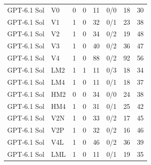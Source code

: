 \begin{tabular}{llrrrrrr}
GPT-6.1 Sol & V0 & 0 & 0 & 11 & 0/0 & 18 & 30 \\
GPT-6.1 Sol & V1 & 1 & 0 & 32 & 0/1 & 23 & 38 \\
GPT-6.1 Sol & V2 & 1 & 0 & 34 & 0/2 & 19 & 48 \\
GPT-6.1 Sol & V3 & 1 & 0 & 40 & 0/2 & 36 & 47 \\
GPT-6.1 Sol & V4 & 1 & 0 & 88 & 0/2 & 92 & 56 \\
GPT-6.1 Sol & LM2 & 1 & 1 & 11 & 0/3 & 18 & 34 \\
GPT-6.1 Sol & LM4 & 1 & 0 & 11 & 0/1 & 18 & 37 \\
GPT-6.1 Sol & HM2 & 0 & 0 & 34 & 0/0 & 24 & 38 \\
GPT-6.1 Sol & HM4 & 1 & 0 & 31 & 0/1 & 25 & 42 \\
GPT-6.1 Sol & V2N & 1 & 0 & 33 & 0/2 & 17 & 45 \\
GPT-6.1 Sol & V2P & 1 & 0 & 32 & 0/2 & 16 & 46 \\
GPT-6.1 Sol & V4L & 1 & 0 & 46 & 0/2 & 36 & 39 \\
GPT-6.1 Sol & LML & 1 & 0 & 11 & 0/1 & 19 & 35 \\
\bottomrule
\end{tabular}

